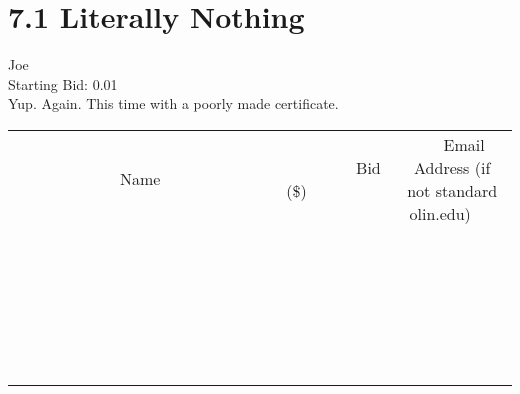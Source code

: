 \documentclass[11pt]{article}
\begin{document}
					\section*{7.1 Literally Nothing}
					Joe \\
					Starting Bid: 0.01 \\
					Yup. Again. This time with a poorly made certificate. \\
					[6ex]
					\begin{tabular}{c c c}
						~~~~~~~~~~~~~Name~~~~~~~~~~~~~ & ~~~~~~~~~Bid (\$)~~~~~~~~~ & ~~~Email Address (if not standard olin.edu)~~~ \\
				
 & & \\
\hline
 & & \\
\hline
 & & \\
\hline
 & & \\
\hline
 & & \\
\hline
 & & \\
\hline
 & & \\
\hline
 & & \\
\hline
 & & \\
\hline
 & & \\
\hline
 & & \\
\hline
 & & \\
\hline
 & & \\
\hline
 & & \\
\hline
 & & \\
\hline
 & & \\
\hline
 & & \\
\hline
 & & \\
\hline
 & & \\
\hline
 & & \\
\hline
 & & \\
\hline
 & & \\
\hline
 & & \\
\hline
 & & \\
\hline
 & & \\
\hline
 & & \\
\hline
					\end{tabular}
					\clearpage
				
\end{document}

